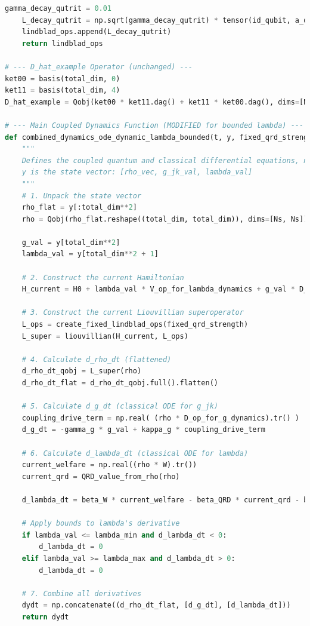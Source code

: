 \documentclass[9pt]{article}
\begin{document}
\begin{lstlisting}[language=Python, basicstyle=\ttfamily\footnotesize, breaklines=true, frame=single, caption={Python Code for Quantum-Classical Coupled with bounded Dynamics}, label={lst:qrd_code}]
    gamma_decay_qutrit = 0.01
    L_decay_qutrit = np.sqrt(gamma_decay_qutrit) * tensor(id_qubit, a_qt)
    lindblad_ops.append(L_decay_qutrit)
    return lindblad_ops

# --- D_hat_example Operator (unchanged) ---
ket00 = basis(total_dim, 0)
ket11 = basis(total_dim, 4)
D_hat_example = Qobj(ket00 * ket11.dag() + ket11 * ket00.dag(), dims=[Ns, Ns])

# --- Main Coupled Dynamics Function (MODIFIED for bounded lambda) ---
def combined_dynamics_ode_dynamic_lambda_bounded(t, y, fixed_qrd_strength, gamma_g, kappa_g, D_op_for_g_dynamics, V_op_for_lambda_dynamics, beta_W, beta_QRD, beta_lambda, lambda_min, lambda_max):
    """
    Defines the coupled quantum and classical differential equations, now with bounded dynamic lambda.
    y is the state vector: [rho_vec, g_jk_val, lambda_val]
    """
    # 1. Unpack the state vector
    rho_flat = y[:total_dim**2]
    rho = Qobj(rho_flat.reshape((total_dim, total_dim)), dims=[Ns, Ns])
    
    g_val = y[total_dim**2]
    lambda_val = y[total_dim**2 + 1]

    # 2. Construct the current Hamiltonian
    H_current = H0 + lambda_val * V_op_for_lambda_dynamics + g_val * D_op_for_g_dynamics
    
    # 3. Construct the current Liouvillian superoperator
    L_ops = create_fixed_lindblad_ops(fixed_qrd_strength)
    L_super = liouvillian(H_current, L_ops)

    # 4. Calculate d_rho_dt (flattened)
    d_rho_dt_qobj = L_super(rho)
    d_rho_dt_flat = d_rho_dt_qobj.full().flatten()

    # 5. Calculate d_g_dt (classical ODE for g_jk)
    coupling_drive_term = np.real( (rho * D_op_for_g_dynamics).tr() )
    d_g_dt = -gamma_g * g_val + kappa_g * coupling_drive_term

    # 6. Calculate d_lambda_dt (classical ODE for lambda)
    current_welfare = np.real((rho * W).tr())
    current_qrd = QRD_value_from_rho(rho)

    d_lambda_dt = beta_W * current_welfare - beta_QRD * current_qrd - beta_lambda * lambda_val
    
    # Apply bounds to lambda's derivative
    if lambda_val <= lambda_min and d_lambda_dt < 0:
        d_lambda_dt = 0
    elif lambda_val >= lambda_max and d_lambda_dt > 0:
        d_lambda_dt = 0
    
    # 7. Combine all derivatives
    dydt = np.concatenate((d_rho_dt_flat, [d_g_dt], [d_lambda_dt]))
    return dydt


\end{lstlisting}
\end{document}
